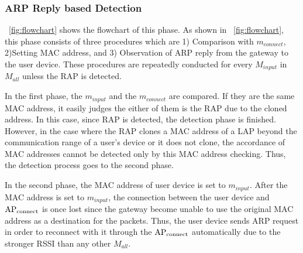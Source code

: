 \documentclass[conference]{IEEEtran}
\newcommand{\tarAP}{\rm AP_{connect}}
\newcommand{\tarMAC}{m_{connect}}
\newcommand{\inputMAC}{m_{input}}
\begin{document}
\subsubsection{ARP Reply based Detection}
\figurename~\ref{fig:flowchart} shows the flowchart of this phase.
As shown in \figurename~\ref{fig:flowchart}, this phase consists of three procedures which are 1) Comparison with $\tarMAC$, 2)Setting MAC address, and 3) Observation of ARP reply from the gateway to the user device.
These procedures are repeatedly conducted for every $M_{input}$ in $M_{all}$ unless the RAP is detected.

In the first phase, the $\inputMAC$ and the $\tarMAC$ are compared.
If they are the same MAC address, it easily judges the either of them is the RAP due to the cloned address.
In this case, since RAP is detected, the detection phase is finished.
However, in the case where the RAP clones a MAC address of a LAP beyond the communication range of a user's device or it does not clone, the accordance of MAC addresses cannot be detected only by this MAC address checking.
Thus, the detection process goes to the second phase.

In the second phase, the MAC address of user device is set to $\inputMAC$.
After the MAC address is set to $\inputMAC$, the connection between the user device and $\tarAP$ is once lost since the gateway become unable to use the original MAC address as a destination for the packets.
Thus, the user device sends ARP request in order to reconnect with it through the $\tarAP$ automatically due to the stronger RSSI than any other $M_{all}$.
\end{document}
